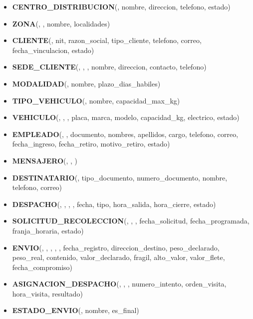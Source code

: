 {\singlespacing\small\sloppy
\begin{itemize}[leftmargin=0.6cm,itemsep=3pt,label={}]
  \item \textbf{CENTRO\_DISTRIBUCION}(, nombre, direccion, telefono, estado)
  \item \textbf{ZONA}(, , nombre, localidades)
  \item \textbf{CLIENTE}(, nit, razon\_social, tipo\_cliente, telefono, correo, fecha\_vinculacion, estado)
  \item \textbf{SEDE\_CLIENTE}(, , , nombre, direccion, contacto, telefono)
  \item \textbf{MODALIDAD}(, nombre, plazo\_dias\_habiles)
  \item \textbf{TIPO\_VEHICULO}(, nombre, capacidad\_max\_kg)
  \item \textbf{VEHICULO}(, , , placa, marca, modelo, capacidad\_kg, electrico, estado)
  \item \textbf{EMPLEADO}(, , documento, nombres, apellidos, cargo, telefono, correo, fecha\_ingreso, fecha\_retiro, motivo\_retiro, estado)
  \item \textbf{MENSAJERO}(, , )
  \item \textbf{DESTINATARIO}(, tipo\_documento, numero\_documento, nombre, telefono, correo)
  \item \textbf{DESPACHO}(, , , , fecha, tipo, hora\_salida, hora\_cierre, estado)
  \item \textbf{SOLICITUD\_RECOLECCION}(, , , fecha\_solicitud, fecha\_programada, franja\_horaria, estado)
  \item \textbf{ENVIO}(, , , , , fecha\_registro, direccion\_destino, peso\_declarado, peso\_real, contenido, valor\_declarado, fragil, alto\_valor, valor\_flete, fecha\_compromiso)
  \item \textbf{ASIGNACION\_DESPACHO}(, , , numero\_intento, orden\_visita, hora\_visita, resultado)
  \item \textbf{ESTADO\_ENVIO}(, nombre, es\_final)

\end{itemize}}
